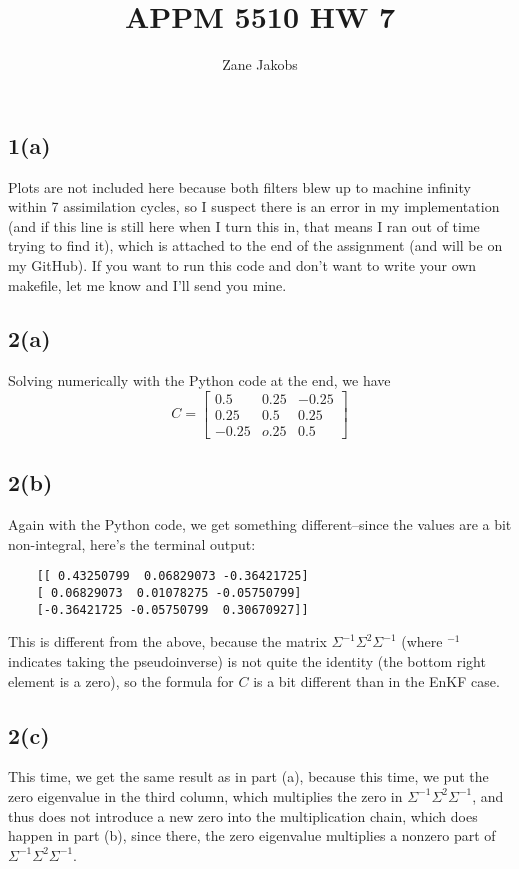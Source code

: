 \documentclass[11pt]{article}
\title{APPM 5510 HW 7}
\author{Zane Jakobs}
\begin{document}
	
	
	\subsection*{1(a)} Plots are not included here because both filters blew up to machine infinity within 7 assimilation cycles, so I suspect there is an error in my implementation (and if this line is still here when I turn this in, that means I ran out of time trying to find it), which is attached to the end of the assignment (and will be on my GitHub). If you want to run this code and don't want to write your own makefile, let me know and I'll send you mine.
	
	
	\subsection*{2(a)} Solving numerically with the Python code at the end, we have 
	\[
		C = \begin{bmatrix} 0.5 & 0.25 & -0.25 \\ 0.25 & 0.5 & 0.25 \\ -0.25 & o.25 & 0.5\end{bmatrix}
	\]
	\subsection*{2(b)} Again with the Python code, we get something different--since the values are a bit non-integral, here's the terminal output:\\
	\begin{Verbatim}
	[[ 0.43250799  0.06829073 -0.36421725]
	[ 0.06829073  0.01078275 -0.05750799]
	[-0.36421725 -0.05750799  0.30670927]]
	\end{Verbatim}
	
	This is different from the above, because the matrix $\Sigma^{-1}\Sigma^2\Sigma^{-1}$ (where $^{-1}$ indicates taking the pseudoinverse) is not quite the identity (the bottom right element is a zero), so the formula for $C$ is a bit different than in the EnKF case.
	
	\subsection*{2(c)} This time, we get the same result as in part (a), because this time, we put the zero eigenvalue in the third column, which multiplies the zero in $\Sigma^{-1}\Sigma^2\Sigma^{-1}$, and thus does not introduce a new zero into the multiplication chain, which does happen in part (b), since there, the zero eigenvalue multiplies a nonzero part of $\Sigma^{-1}\Sigma^2\Sigma^{-1}$.
	
\end{document}
